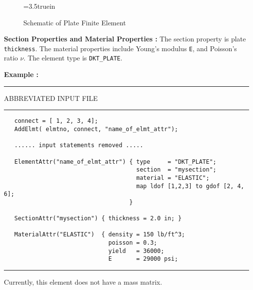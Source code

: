 \begin{figure} [ht]
\epsfxsize=3.5truein
\centerline{}
\caption{Schematic of Plate Finite Element}
\label{fig:fe-plate}
\end{figure}

\vspace{0.15 in}\noindent
{\bf Section Properties and Material Properties :} 
The section property is plate {\tt thickness}.
The material properties include Young's modulus {\tt E},
and Poisson's ratio $\nu$.
The element type is {\tt DKT\_PLATE}.

\vspace{0.15 in}\noindent
{\bf Example :} 

\vspace{0.10 in}
\begin{footnotesize}
\noindent
{\rule{2.1 in}{0.035 in} ABBREVIATED INPUT FILE \rule{2.1 in}{0.035 in} }
\begin{verbatim}
   connect = [ 1, 2, 3, 4];
   AddElmt( elmtno, connect, "name_of_elmt_attr");

   ...... input statements removed .....

   ElementAttr("name_of_elmt_attr") { type     = "DKT_PLATE";
                                      section  = "mysection";
                                      material = "ELASTIC";
                                      map ldof [1,2,3] to gdof [2, 4, 6];
                                    }

   SectionAttr("mysection") { thickness = 2.0 in; }

   MaterialAttr("ELASTIC")  { density = 150 lb/ft^3;
                              poisson = 0.3;
                              yield   = 36000;
                              E       = 29000 psi;
\end{verbatim}
\rule{6.25 in}{0.035 in}
\end{footnotesize}

\vspace{0.15 in}\noindent
Currently, this element does not have a mass matrix.
